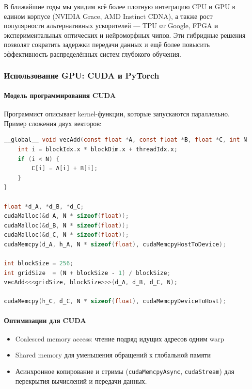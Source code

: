 В ближайшие годы мы увидим всё более плотную интеграцию CPU и GPU в едином корпусе (NVIDIA Grace, AMD Instinct CDNA), а также рост популярности альтернативных ускорителей — TPU от Google, FPGA и экспериментальных оптических и нейроморфных чипов. Эти гибридные решения позволят сократить задержки передачи данных и ещё более повысить эффективность распределённых систем глубокого обучения.  


\subsubsection{Использование GPU: CUDA и PyTorch}
\label{sec:tools_gpu}

\paragraph{Модель программирования CUDA}
Программист описывает kernel-функции, которые запускаются параллельно. Пример сложения двух векторов:

\begin{lstlisting}[language=C,caption={CUDA: сложение векторов},label={lst:cuda_vecadd}]
__global__ void vecAdd(const float *A, const float *B, float *C, int N) {
    int i = blockIdx.x * blockDim.x + threadIdx.x;
    if (i < N) {
        C[i] = A[i] + B[i];
    }
}

float *d_A, *d_B, *d_C;
cudaMalloc(&d_A, N * sizeof(float));
cudaMalloc(&d_B, N * sizeof(float));
cudaMalloc(&d_C, N * sizeof(float));
cudaMemcpy(d_A, h_A, N * sizeof(float), cudaMemcpyHostToDevice);

int blockSize = 256;
int gridSize  = (N + blockSize - 1) / blockSize;
vecAdd<<<gridSize, blockSize>>>(d_A, d_B, d_C, N);

cudaMemcpy(h_C, d_C, N * sizeof(float), cudaMemcpyDeviceToHost);
\end{lstlisting}

\paragraph{Оптимизации для CUDA}
\begin{itemize}
  \item Coalesced memory access: чтение подряд идущих адресов одним warp\;
  \item Shared memory для уменьшения обращений к глобальной памяти\;
  \item Асинхронное копирование и стримы (\texttt{cudaMemcpyAsync}, \texttt{cudaStream}) для перекрытия вычислений и передачи данных.
\end{itemize}

